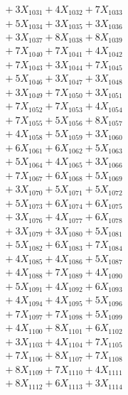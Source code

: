 \documentclass[a4paper,10pt]{article}
\begin{document}
{\begin{align}
&\;  + 3 X_{1031} + 4 X_{1032} + 7 X_{1033} \\[0.3ex]
&\;  + 5 X_{1034} + 3 X_{1035} + 3 X_{1036} \\[0.3ex]
&\;  + 3 X_{1037} + 8 X_{1038} + 8 X_{1039} \\[0.3ex]
&\;  + 7 X_{1040} + 7 X_{1041} + 4 X_{1042} \\[0.3ex]
&\;  + 7 X_{1043} + 3 X_{1044} + 7 X_{1045} \\[0.3ex]
&\;  + 5 X_{1046} + 3 X_{1047} + 3 X_{1048} \\[0.3ex]
&\;  + 3 X_{1049} + 7 X_{1050} + 3 X_{1051} \\[0.3ex]
&\;  + 7 X_{1052} + 7 X_{1053} + 4 X_{1054} \\[0.3ex]
&\;  + 7 X_{1055} + 5 X_{1056} + 8 X_{1057} \\[0.3ex]
&\;  + 4 X_{1058} + 5 X_{1059} + 3 X_{1060} \\[0.5ex]\allowbreak
&\;  + 6 X_{1061} + 6 X_{1062} + 5 X_{1063} \\[0.3ex]
&\;  + 5 X_{1064} + 4 X_{1065} + 3 X_{1066} \\[0.3ex]
&\;  + 7 X_{1067} + 6 X_{1068} + 5 X_{1069} \\[0.3ex]
&\;  + 3 X_{1070} + 5 X_{1071} + 5 X_{1072} \\[0.3ex]
&\;  + 5 X_{1073} + 6 X_{1074} + 6 X_{1075} \\[0.3ex]
&\;  + 3 X_{1076} + 4 X_{1077} + 6 X_{1078} \\[0.3ex]
&\;  + 3 X_{1079} + 3 X_{1080} + 5 X_{1081} \\[0.3ex]
&\;  + 5 X_{1082} + 6 X_{1083} + 7 X_{1084} \\[0.3ex]
&\;  + 4 X_{1085} + 4 X_{1086} + 5 X_{1087} \\[0.3ex]
&\;  + 4 X_{1088} + 7 X_{1089} + 4 X_{1090} \\[0.5ex]\allowbreak
&\;  + 5 X_{1091} + 4 X_{1092} + 6 X_{1093} \\[0.3ex]
&\;  + 4 X_{1094} + 4 X_{1095} + 5 X_{1096} \\[0.3ex]
&\;  + 7 X_{1097} + 7 X_{1098} + 5 X_{1099} \\[0.3ex]
&\;  + 4 X_{1100} + 8 X_{1101} + 6 X_{1102} \\[0.3ex]
&\;  + 3 X_{1103} + 4 X_{1104} + 7 X_{1105} \\[0.3ex]
&\;  + 7 X_{1106} + 8 X_{1107} + 7 X_{1108} \\[0.3ex]
&\;  + 8 X_{1109} + 7 X_{1110} + 4 X_{1111} \\[0.3ex]
&\;  + 8 X_{1112} + 6 X_{1113} + 3 X_{1114} \\[0.3ex]

\end{align}}
\end{document}
